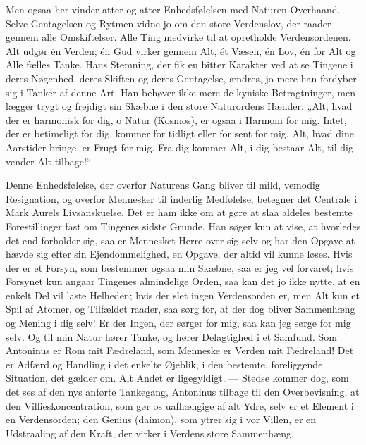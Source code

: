 \documentclass[12pt,a4paper,openany]{book}
\newcommand{\opage}[1]{\marginnote{\footnotesize\textit{[#1]}}}
\begin{document}
Men ogsaa her vinder atter og atter Enhedsfølelsen med
Naturen Overhaand. Selve Gentagelsen og Rytmen vidne jo
om den store Verdenslov, der raader gennem alle Omskiftelser.
Alle Ting medvirke til at opretholde Verdensordenen. Alt udgør
én Verden; én Gud virker gennem Alt, ét Væsen, én Lov,
én for Alt og Alle fælles Tanke. Hans Stemning, der fik en
bitter Karakter ved at se Tingene i deres Nøgenhed, deres
Skiften og deres Gentagelse, ændres, jo mere han fordyber sig
i Tanker af denne Art. Han behøver ikke mere de kyniske
Betragtninger, men lægger trygt og frejdigt sin Skæbne i den
store Naturordens Hænder. „Alt, hvad der er harmonisk for
dig, o Natur (Kosmos), er ogsaa i Harmoni for mig. Intet,
der er betimeligt for dig, kommer for tidligt eller for sent for
mig. Alt, hvad dine Aarstider bringe, er Frugt for mig. Fra
dig kommer Alt, i dig bestaar Alt, til dig vender Alt tilbage!“

Denne Enhedsfølelse, der overfor Naturens Gang bliver
til mild, vemodig Resignation, og overfor Mennesker til inderlig
Medfølelse, betegner det Centrale i Mark Aurels Livsanskuelse.
Det er ham ikke om at gøre at slaa aldeles bestemte Forestillinger
fast om Tingenes sidste Grunde. Han søger kun at
\setcounter{footnote}{0}%
\opage{116}vise, at hvorledes det end forholder sig, saa er Mennesket
Herre over sig selv og har den Opgave at hævde sig efter
sin Ejendommelighed, en Opgave, der altid vil kunne løses.
Hvis der er et Forsyn, som bestemmer ogsaa min Skæbne,
saa er jeg vel forvaret; hvis Forsynet kun angaar Tingenes almindelige
Orden, saa kan det jo ikke nytte, at en enkelt Del
vil laste Helheden; hvis der slet ingen Verdensorden er, men
Alt kun et Spil af Atomer, og Tilfældet raader, saa sørg for,
at der dog bliver Sammenhæng og Mening i dig selv! Er der
Ingen, der sørger for mig, saa kan jeg sørge for mig selv. Og
til min Natur hører Tanke, og hører Delagtighed i et Samfund.
Som Antoninus er Rom mit Fædreland, som Menneske er Verden
mit Fædreland! Det er Adfærd og Handling i det enkelte
Øjeblik, i den bestemte, foreliggende Situation, det gælder om.
Alt Andet er ligegyldigt. --- Stedse kommer dog, som det ses
af den nys anførte Tankegang, Antoninus tilbage til den Overbevisning,
at den Villieskoncentration, som gør os uafhængige
af alt Ydre, selv er et Element i en Verdensorden; den Genius
(daimon), som ytrer sig i vor Villen, er en Udstraaling af den
Kraft, der virker i Verdens store Sammenhæng.
\end{document}
